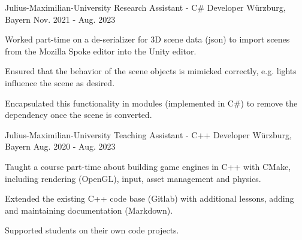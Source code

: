 

\begin{cventries}

  \cventry
    {Julius-Maximilian-University} %
    {Research Assistant - C\# Developer} %
    {Würzburg, Bayern} %
    {Nov. 2021 - Aug. 2023} %
    {
      \begin{cvitems} %
        \item {Worked part-time on a de-serializer for 3D scene data (json) to import scenes from the Mozilla Spoke editor into the Unity editor.}
        \item {Ensured that the behavior of the scene objects is mimicked correctly, e.g. lights influence the scene as desired.}
        \item {Encapsulated this functionality in modules (implemented in C\#) to remove the dependency once the scene is converted.}
      \end{cvitems}
    }

  \cventry
    {Julius-Maximilian-University} %
    {Teaching Assistant - C++ Developer} %
    {Würzburg, Bayern} %
    {Aug. 2020 - Aug. 2023} %
    {
      \begin{cvitems} %
        \item {Taught a course part-time about building game engines in C++ with CMake, including rendering (OpenGL), input, asset management and physics.}
        \item {Extended the existing C++ code base (Gitlab) with additional lessons, adding and maintaining documentation (Markdown).}
        \item {Supported students on their own code projects.}
      \end{cvitems}
    }
  

\end{cventries}
